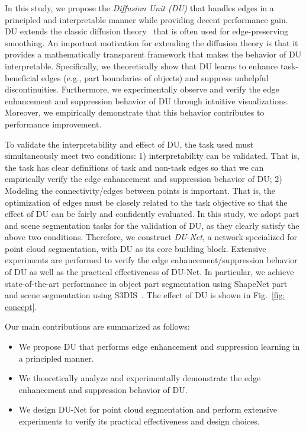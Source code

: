 \documentclass[a4paper,fleqn]{cas-dc}
\begin{document}
In this study, we propose the \textit{Diffusion Unit (DU)} that handles edges in a principled and interpretable manner while providing decent performance gain. 
DU extends the classic diffusion theory~\cite{perona1990scale,weickert1998anisotropic} that is often used for edge-preserving smoothing. An important motivation for extending the diffusion theory is that it provides a mathematically transparent framework that makes the behavior of DU interpretable. 
Specifically, we theoretically show that DU learns to enhance task-beneficial edges (e.g., part boundaries of objects) and suppress unhelpful discontinuities. 
Furthermore, we experimentally observe and verify the edge enhancement and suppression behavior of DU through intuitive visualizations. 
Moreover, we empirically demonstrate that this behavior contributes to performance improvement. 

To validate the interpretability and effect of DU, the task used must simultaneously meet two conditions: 1) interpretability can be validated. That is, the task has clear definitions of task and non-task edges so that we can empirically verify the edge enhancement and suppression behavior of DU; 2) Modeling the connectivity/edges between points is important. That is, the optimization of edges must be closely related to the task objective so that the effect of DU can be fairly and confidently evaluated. In this study, we adopt part and scene segmentation tasks for the validation of DU, as they clearly satisfy the above two conditions.
Therefore, we construct \textit{DU-Net}, a network specialized for point cloud segmentation, with DU as its core building block.
Extensive experiments are performed to verify the edge enhancement/suppression behavior of DU as well as the practical effectiveness of DU-Net. In particular, we achieve state-of-the-art performance in object part segmentation using ShapeNet part~\cite{yi2016scalable} and scene segmentation using S3DIS~\cite{armeni20163d}. The effect of DU is shown in Fig.~\ref{fig: concept}.

Our main contributions are summarized as follows:
\begin{itemize}
    \item We propose DU that performs edge enhancement and suppression learning in a principled manner.
    \item We theoretically analyze and experimentally demonstrate the edge enhancement and suppression behavior of DU.  
    \item We design DU-Net for point cloud segmentation and perform extensive experiments to verify its practical effectiveness and design choices. 
\end{itemize} 
\end{document}
